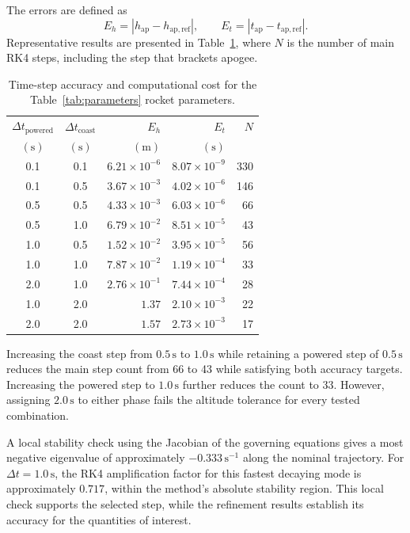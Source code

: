 \documentclass{article}
\begin{document}
The errors are defined as
\[
E_h=\left|h_{\mathrm{ap}}-h_{\mathrm{ap,ref}}\right|,
\qquad
E_t=\left|t_{\mathrm{ap}}-t_{\mathrm{ap,ref}}\right|.
\]
Representative results are presented in
Table~\ref{tab:simulation_parameter_evaluation}, where $N$ is the
number of main RK4 steps, including the step that brackets apogee.

\begin{table}[htbp]
\centering
\caption{Time-step accuracy and computational cost for the
Table~\ref{tab:parameters} rocket parameters.}
\label{tab:simulation_parameter_evaluation}
\small
\begin{tabular}{ccrrr}
\hline
$\Delta t_{\mathrm{powered}}$ &
$\Delta t_{\mathrm{coast}}$ &
$E_h$ & $E_t$ & $N$ \\
$(\mathrm{s})$ & $(\mathrm{s})$ &
$(\mathrm{m})$ & $(\mathrm{s})$ & \\
\hline
0.1 & 0.1 & $6.21\times10^{-6}$ & $8.07\times10^{-9}$ & 330 \\
0.1 & 0.5 & $3.67\times10^{-3}$ & $4.02\times10^{-6}$ & 146 \\
0.5 & 0.5 & $4.33\times10^{-3}$ & $6.03\times10^{-6}$ & 66 \\
0.5 & 1.0 & $6.79\times10^{-2}$ & $8.51\times10^{-5}$ & 43 \\
1.0 & 0.5 & $1.52\times10^{-2}$ & $3.95\times10^{-5}$ & 56 \\
1.0 & 1.0 & $7.87\times10^{-2}$ & $1.19\times10^{-4}$ & 33 \\
2.0 & 1.0 & $2.76\times10^{-1}$ & $7.44\times10^{-4}$ & 28 \\
1.0 & 2.0 & $1.37$             & $2.10\times10^{-3}$ & 22 \\
2.0 & 2.0 & $1.57$             & $2.73\times10^{-3}$ & 17 \\
\hline
\end{tabular}
\end{table}

Increasing the coast step from $0.5\,\mathrm{s}$ to
$1.0\,\mathrm{s}$ while retaining a powered step of
$0.5\,\mathrm{s}$ reduces the main step count from 66 to 43
while satisfying both accuracy targets. Increasing the powered
step to $1.0\,\mathrm{s}$ further reduces the count to 33.
However, assigning $2.0\,\mathrm{s}$ to either phase fails the
altitude tolerance for every tested combination.

A local stability check using the Jacobian of the governing equations
gives a most negative eigenvalue of approximately
$-0.333\,\mathrm{s^{-1}}$ along the nominal trajectory.
For $\Delta t=1.0\,\mathrm{s}$, the RK4 amplification factor for
this fastest decaying mode is approximately $0.717$, within the
method's absolute stability region. This local check supports the
selected step, while the refinement results establish its accuracy
for the quantities of interest.
\end{document}
